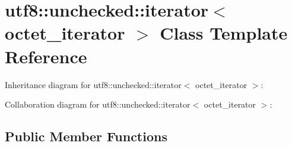 \hypertarget{classutf8_1_1unchecked_1_1iterator}{}\section{utf8\+:\+:unchecked\+:\+:iterator$<$ octet\+\_\+iterator $>$ Class Template Reference}
\label{classutf8_1_1unchecked_1_1iterator}


Inheritance diagram for utf8\+:\+:unchecked\+:\+:iterator$<$ octet\+\_\+iterator $>$\+:


Collaboration diagram for utf8\+:\+:unchecked\+:\+:iterator$<$ octet\+\_\+iterator $>$\+:
\subsection*{Public Member Functions}
